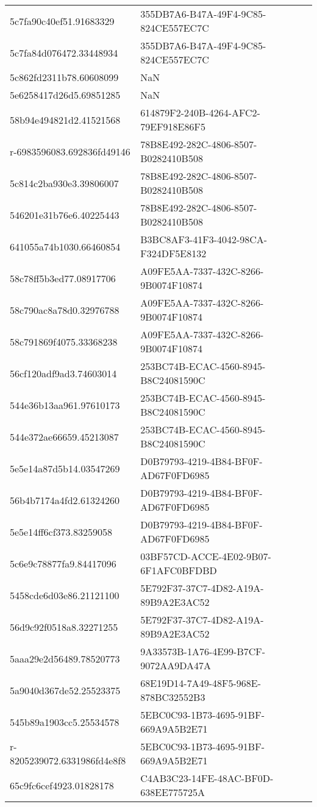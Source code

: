 \begin{tabular}{ll}
5c7fa90c40ef51.91683329 & 355DB7A6-B47A-49F4-9C85-824CE557EC7C \\
5c7fa84d076472.33448934 & 355DB7A6-B47A-49F4-9C85-824CE557EC7C \\
5c862fd2311b78.60608099 & NaN \\
5e6258417d26d5.69851285 & NaN \\
58b94e494821d2.41521568 & 614879F2-240B-4264-AFC2-79EF918E86F5 \\
r-6983596083.692836fd49146 & 78B8E492-282C-4806-8507-B0282410B508 \\
5c814c2ba930e3.39806007 & 78B8E492-282C-4806-8507-B0282410B508 \\
546201e31b76e6.40225443 & 78B8E492-282C-4806-8507-B0282410B508 \\
641055a74b1030.66460854 & B3BC8AF3-41F3-4042-98CA-F324DF5E8132 \\
58c78ff5b3ed77.08917706 & A09FE5AA-7337-432C-8266-9B0074F10874 \\
58c790ac8a78d0.32976788 & A09FE5AA-7337-432C-8266-9B0074F10874 \\
58c791869f4075.33368238 & A09FE5AA-7337-432C-8266-9B0074F10874 \\
56cf120adf9ad3.74603014 & 253BC74B-ECAC-4560-8945-B8C24081590C \\
544e36b13aa961.97610173 & 253BC74B-ECAC-4560-8945-B8C24081590C \\
544e372ae66659.45213087 & 253BC74B-ECAC-4560-8945-B8C24081590C \\
5e5e14a87d5b14.03547269 & D0B79793-4219-4B84-BF0F-AD67F0FD6985 \\
56b4b7174a4fd2.61324260 & D0B79793-4219-4B84-BF0F-AD67F0FD6985 \\
5e5e14ff6cf373.83259058 & D0B79793-4219-4B84-BF0F-AD67F0FD6985 \\
5c6e9c78877fa9.84417096 & 03BF57CD-ACCE-4E02-9B07-6F1AFC0BFDBD \\
5458cde6d03e86.21121100 & 5E792F37-37C7-4D82-A19A-89B9A2E3AC52 \\
56d9c92f0518a8.32271255 & 5E792F37-37C7-4D82-A19A-89B9A2E3AC52 \\
5aaa29e2d56489.78520773 & 9A33573B-1A76-4E99-B7CF-9072AA9DA47A \\
5a9040d367de52.25523375 & 68E19D14-7A49-48F5-968E-878BC32552B3 \\
545b89a1903cc5.25534578 & 5EBC0C93-1B73-4695-91BF-669A9A5B2E71 \\
r-8205239072.6331986fd4e8f8 & 5EBC0C93-1B73-4695-91BF-669A9A5B2E71 \\
65c9fc6cef4923.01828178 & C4AB3C23-14FE-48AC-BF0D-638EE775725A \\

\end{tabular}
